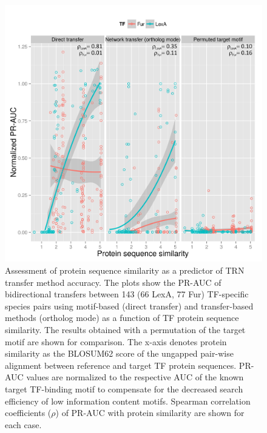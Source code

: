 \begin{figure}
  \centering
  \includegraphics[width=\textwidth]{figures/chapter3/protein-sequence-similarity}
  \caption[Assessment of protein sequence similarity as a predictor of TRN
  transfer method accuracy.]{Assessment of protein sequence similarity as a
    predictor of TRN transfer method accuracy. The plots show the PR-AUC of
    bidirectional transfers between 143 (66 LexA, 77 Fur) TF-specific species
    pairs using motif-based (direct transfer) and transfer-based methods
    (ortholog mode) as a function of TF protein sequence similarity. The
    results obtained with a permutation of the target motif are shown for
    comparison. The x-axis denotes protein similarity as the BLOSUM62 score of
    the ungapped pair-wise alignment between reference and target TF protein
    sequences. PR-AUC values are normalized to the respective AUC of the known
    target TF-binding motif to compensate for the decreased search efficiency
    of low information content motifs. Spearman correlation coefficients
    ($\rho$) of PR-AUC with protein similarity are shown for each case.}
\label{fig:protein-sequence-similarity}
\end{figure}


